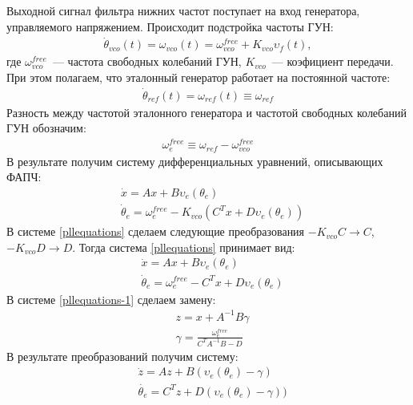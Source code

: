 \documentclass[a4paper,14pt]{article} %
\theoremstyle{cited}
\begin{document}
Выходной сигнал фильтра нижних частот поступает на вход генератора, управляемого напряжением. Происходит подстройка частоты ГУН:
 \begin{equation*}
 \begin{aligned}
\dot{\theta}_{vco}(t) = \omega_{vco}(t) = \omega^{free}_{vco} + K_{vco}\upsilon_f(t),
 \end{aligned}
\end{equation*}
где $\omega^{free}_{vco}$~--- частота свободных колебаний ГУН, $K_{vco}$~--- коэфициент передачи. При этом полагаем, что эталонный генератор работает на постоянной частоте:
 \begin{equation*}
 \begin{aligned}
\dot{\theta}_{ref}(t) = \omega_{ref}(t) \equiv \omega_{ref}
 \end{aligned}
\end{equation*}
Разность между частотой эталонного генератора и частотой свободных колебаний ГУН обозначим:
 \begin{equation*}
 \begin{aligned}
\omega_e^{free} \equiv \omega_{ref} - \omega^{free}_{vco}
 \end{aligned}
\end{equation*}
В результате получим систему дифференциальных уравнений, описывающих ФАПЧ:
 \begin{equation}\label{pllequations}
 \begin{aligned}
 &\dot{x} = Ax + B\upsilon_e(\theta_e)\\
 &\dot{\theta}_e = \omega_e^{free} - K_{vco}(C^Tx + D\upsilon_e(\theta_e))
 \end{aligned}
\end{equation}
В системе \eqref{pllequations} сделаем следующие преобразования $-K_{vco}C \rightarrow C$, $-K_{vco}D \rightarrow D$. Тогда система \eqref{pllequations} принимает вид:
 \begin{equation}\label{pllequations-1}
 \begin{aligned}
 &\dot{x} = Ax + B\upsilon_e(\theta_e)\\
 &\dot{\theta}_e = \omega_e^{free} - C^Tx + D\upsilon_e(\theta_e)
 \end{aligned}
\end{equation}
В системе \eqref{pllequations-1} сделаем замену:
 \begin{equation}
 \begin{aligned}
 &z = x + A^{-1}B\gamma \\
 &\gamma = \frac{\omega_e^{free}}{C^TA^{-1}B-D}
 \end{aligned}
\end{equation}
В результате преобразований получим систему:
 \begin{equation}\label{system_pll}
 \begin{aligned}
 &\dot{z} = Az + B(\upsilon_e(\theta_e) - \gamma)\\
 &\dot{\theta_e} = C^Tz + D(\upsilon_e(\theta_e) - \gamma))
 \end{aligned}
\end{equation}
\end{document}
